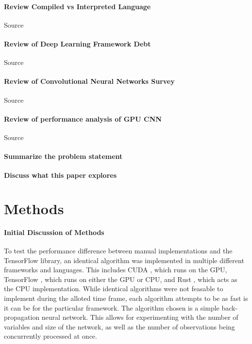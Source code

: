 \documentclass[12pt]{article}
\begin{document}


\paragraph{Review Compiled vs Interpreted Language}

Source \cite{article_compiled_interpreted_hybrid_languages}

\paragraph{Review of Deep Learning Framework Debt}

Source \cite{article_deep_learning_framework_debt}

\paragraph{Review of Convolutional Neural Networks Survey}

Source \cite{article_cnn_survey}

\paragraph{Review of performance analysis of GPU CNN}

Source \cite{article_performance_analysis_gpu_cnn}

\paragraph{Summarize the problem statement}

\paragraph{Discuss what this paper explores}


\section{Methods}

\paragraph{Initial Discussion of Methods}

To test the performance difference between manual implementations and the TensorFlow library, an identical algorithm was implemented in multiple different frameworks and languages.
This includes CUDA \cite{lib_cuda}, which runs on the GPU, TensorFlow \cite{lib_tensorflow}, which runs on either the GPU or CPU, and Rust \cite{lang_rust}, which acts as the CPU implementation.
While identical algorithms were not feasable to implement during the alloted time frame, each algorithm attempts to be as fast is it can be for the particular framework.
The algorithm chosen is a simple back-propagation neural network.
This allows for experimenting with the number of variables and size of the network, as well as the number of observations being concurrently processed at once.
\end{document}
